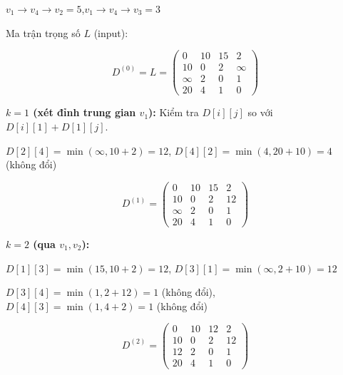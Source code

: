 \documentclass[10pt]{article}
\begin{document}
\begin{center}
\begin{minipage}[t]{0.48\textwidth}
\label{fig:floyd-spt}

{\small $v_1{\to}v_4{\to}v_2{=}5$,\quad $v_1{\to}v_4{\to}v_3{=}3$}
\end{minipage}
\end{center}

\vspace{0.2cm}

Ma trận trọng số $L$ (input):

$$D^{(0)} = L = \begin{pmatrix} 0 & 10 & 15 & 2 \\ 10 & 0 & 2 & \infty \\ \infty & 2 & 0 & 1 \\ 20 & 4 & 1 & 0 \end{pmatrix}$$

\textbf{$k = 1$ (xét đỉnh trung gian $v_1$):} Kiểm tra $D[i][j]$ so với $D[i][1] + D[1][j]$.

$D[2][4] = \min(\infty, 10+2) = 12$, \quad $D[4][2] = \min(4, 20+10) = 4$ (không đổi)

$$D^{(1)} = \begin{pmatrix} 0 & 10 & 15 & 2 \\ 10 & 0 & 2 & 12 \\ \infty & 2 & 0 & 1 \\ 20 & 4 & 1 & 0 \end{pmatrix}$$

\textbf{$k = 2$ (qua $v_1, v_2$):}

$D[1][3] = \min(15, 10+2) = 12$, \quad $D[3][1] = \min(\infty, 2+10) = 12$

$D[3][4] = \min(1, 2+12) = 1$ (không đổi), \quad $D[4][3] = \min(1, 4+2) = 1$ (không đổi)

$$D^{(2)} = \begin{pmatrix} 0 & 10 & 12 & 2 \\ 10 & 0 & 2 & 12 \\ 12 & 2 & 0 & 1 \\ 20 & 4 & 1 & 0 \end{pmatrix}$$
\end{document}
